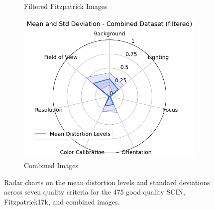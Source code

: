 \begin{figure}[ht]
\begin{subfigure}[b]{0.32\textwidth}
        \caption{Filtered Fitzpatrick Images}
        \label{fig:f17k_hept}
    \end{subfigure}
    \hfill
    \begin{subfigure}[b]{0.32\textwidth}
        \includegraphics[width=\textwidth]{img/COMB_hept.png}
        \caption{Combined Images}
        \label{fig:comb_hept}
    \end{subfigure}
    \caption{Radar charts on the mean distortion levels and standard deviations across seven quality criteria for the 475 good quality SCIN, Fitzpatrick17k, and combined images.}
    \label{fig:hept}
\end{figure}